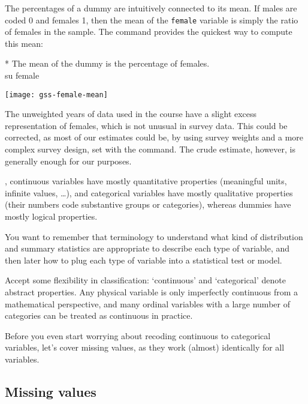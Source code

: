 \begin{description}
	The percentages of a dummy are intuitively connected to its mean. If males are coded 0 and females 1, then the mean of the \texttt{female} variable is simply the ratio of females in the sample. The  command provides the quickest way to compute this mean:
	
	\begin{docspec}
		* The mean of the dummy is the percentage of females.\\
		su female
	\end{docspec}

	\texttt{[image: gss-female-mean]}
	
	The unweighted years of \GSS data used in the course have a slight excess representation of females, which is not unusual in survey data. This could be corrected, as most of our estimates could be, by using survey weights and a more complex survey design, set with the  command. The crude estimate, however, is generally enough for our purposes.\\[1em]

\end{description}

, continuous variables have mostly quantitative properties (meaningful units, infinite values, …), and categorical variables have mostly qualitative properties (their numbers code substantive groups or categories), whereas dummies have mostly logical properties.

You want to remember that terminology to understand what kind of distribution and summary statistics are appropriate to describe each type of variable, and then later how to plug each type of variable into a statistical test or model.

Accept some flexibility in classification: `continuous' and `categorical' denote abstract properties. Any physical variable is only imperfectly continuous from a mathematical perspective, and many ordinal variables with a large number of categories can be treated as continuous in practice.

Before you even start worrying about recoding continuous to categorical variables, let's cover missing values, as they work (almost) identically for all variables.

%
%
%
\subsection{Missing values}
\label{sec:missing-values}

